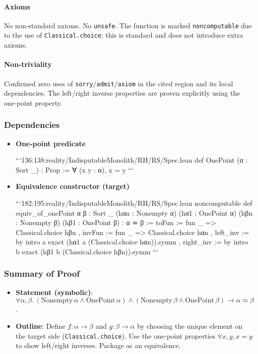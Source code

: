 \documentclass{article}
\begin{document}
\paragraph{Axioms}
No non‑standard axioms. No \texttt{unsafe}. The function is marked \texttt{noncomputable} due to the use of \texttt{Classical.choice}; this is standard and does not introduce extra axioms.

\paragraph{Non-triviality}
Confirmed zero uses of \texttt{sorry}/\texttt{admit}/\texttt{axiom} in the cited region and its local dependencies. The left/right inverse properties are proven explicitly using the one‑point property.

\subsubsection{Dependencies}
\begin{itemize}[leftmargin=*]
  \item \textbf{One‑point predicate}

```136:138:reality/IndisputableMonolith/RH/RS/Spec.lean
def OnePoint (α : Sort _) : Prop := ∀ (x y : α), x = y
```

  \item \textbf{Equivalence constructor (target)}

```182:195:reality/IndisputableMonolith/RH/RS/Spec.lean
noncomputable def equiv_of_onePoint {α β : Sort _}
  (hαn : Nonempty α) (hα1 : OnePoint α)
  (hβn : Nonempty β) (hβ1 : OnePoint β) : α ≃ β :=
{ toFun := fun _ => Classical.choice hβn
, invFun := fun _ => Classical.choice hαn
, left_inv := by
    intro a
    exact (hα1 a (Classical.choice hαn)).symm
, right_inv := by
    intro b
    exact (hβ1 b (Classical.choice hβn)).symm }
```

\end{itemize}

\subsubsection{Summary of Proof}
\begin{itemize}[leftmargin=*]
  \item \textbf{Statement (symbolic)}: \(\forall \alpha,\beta.\, (\mathrm{Nonempty}\,\alpha \land \mathrm{OnePoint}\,\alpha) \land (\mathrm{Nonempty}\,\beta \land \mathrm{OnePoint}\,\beta) \to \alpha \simeq \beta\).
  \item \textbf{Outline}: Define \(f: \alpha \to \beta\) and \(g: \beta \to \alpha\) by choosing the unique element on the target side (\texttt{Classical.choice}). Use the one‑point properties \(\forall x,y, x=y\) to show left/right inverses. Package as an equivalence.
\end{itemize}
\end{document}
